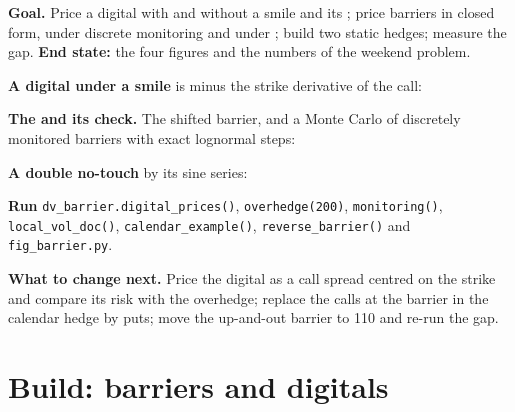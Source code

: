 \begin{tutorial}
\textbf{Goal.} Price a digital with and without a smile and its ; price barriers in closed form,
under discrete monitoring and under ; build two static hedges; measure the gap. \textbf{End state:} the
four figures and the numbers of the weekend problem.
\begin{tutsteps}
\item \textbf{A digital under a smile} is minus the strike derivative of the call:
\label{lst:dv:barriers-and-digitals:digital}
\item \textbf{The  and its check.} The shifted barrier, and a Monte Carlo of discretely monitored barriers
with exact lognormal steps:
\label{lst:dv:barriers-and-digitals:shift}
\item \textbf{A double no-touch} by its sine series:
\label{lst:dv:barriers-and-digitals:dnt}
\item \textbf{Run} \texttt{dv\_barrier.digital\_prices()}, \texttt{overhedge(200)}, \texttt{monitoring()},
\texttt{local\_vol\_doc()}, \texttt{calendar\_example()}, \texttt{reverse\_barrier()} and \texttt{fig\_barrier.py}.
\end{tutsteps}
\textbf{What to change next.} Price the digital as a call spread centred on the strike and compare its risk with the
overhedge; replace the calls at the barrier in the calendar hedge by puts; move the up-and-out barrier to 110 and re-run
the gap.
\end{tutorial}

\section{Build: barriers and digitals}\label{bld:dv:barriers-and-digitals:barrier}

